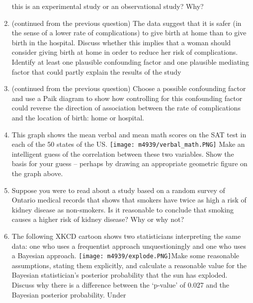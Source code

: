 \documentclass[
]{article}
\begin{document}
\begin{enumerate}
  this is an experimental study or an observational study? Why?
  \vspace{0px}
\item
  (continued from the previous question) The data suggest that it is
  safer (in the sense of a lower rate of complications) to give birth at
  home than to give birth in the hospital. Discuss whether this implies
  that a woman should consider giving birth at home in order to reduce
  her risk of complications. Identify at least one plausible confounding
  factor and one plausible mediating factor that could partly explain
  the results of the study \vspace{0px}
\item
  (continued from the previous question) Choose a possible confounding
  factor and use a Paik diagram to show how controlling for this
  confounding factor could reverse the direction of association between
  the rate of complications and the location of birth: home or hospital.
  \vspace{0px}
\item
  This graph shows the mean verbal and mean math scores on the SAT test
  in each of the 50 states of the US.
  \newline\nopagebreak \texttt{[image: m4939/verbal\_math.PNG]}
  \newline\nopagebreak Make an intelligent guess of the correlation
  between these two variables. Show the basis for your guess -- perhaps
  by drawing an appropriate geometric figure on the graph above.
  \vspace{0px}
\item
  Suppose you were to read about a study based on a random survey of
  Ontario medical records that shows that smokers have twice as high a
  risk of kidney disease as non-smokers. Is it reasonable to conclude
  that smoking causes a higher risk of kidney disease? Why or why not?
  \vspace{0px}
\item
  The following XKCD cartoon shows two statisticians interpreting the
  same data: one who uses a frequentist approach unquestioningly and one
  who uses a Bayesian approach.
  \newline\nopagebreak \texttt{[image: m4939/explode.PNG]}\newline\nopagebreak Make
  some reasonable assumptions, stating them explicitly, and calculate a
  reasonable value for the Bayesian statistician's posterior probability
  that the sun has exploded. Discuss why there is a difference between
  the `p-value' of 0.027 and the Bayesian posterior probability. Under

\end{enumerate}
\end{document}
